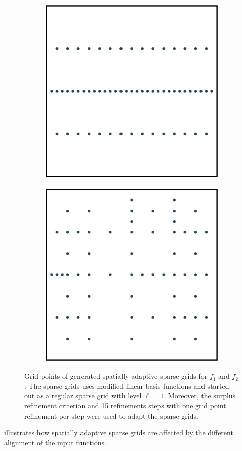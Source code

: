 \documentclass[
  a4paper,  %
  twoside,  %
  bibliography=totoc,
  headsepline,
  cleardoublepage=empty,
  parskip=half,
  draft=false
]{scrbook}
\begin{document}
\begin{mdframed}[style=style]
\begin{figure}[H]
\begin{subfigure}{.5\textwidth}
  \centering
  \includegraphics[width=.65\linewidth]{graphics/grid_f1}
  \label{fig:grid_f1}
\vspace{2.5mm}
\end{subfigure}%
\begin{subfigure}{.5\textwidth}
  \centering
  \includegraphics[width=.65\linewidth]{graphics/grid_f2}
  \label{fig:grid_f2}
\vspace{2.5mm}
\end{subfigure}
\delimit
\caption{Grid points of generated spatially adaptive sparse grids for $f_1$ and $f_2$.
The sparse grids uses modified linear basis functions and started out as a regular sparse grid with level $\ell=1$. Moreover, the surplus refinement criterion and 15 refinements steps with one grid point refinement per step were used to adapt the sparse grids.}
\label{fig:grids}
\end{figure}
\end{mdframed}
%
 illustrates how spatially adaptive sparse grids are affected by the different alignment of the input functions.
\end{document}
